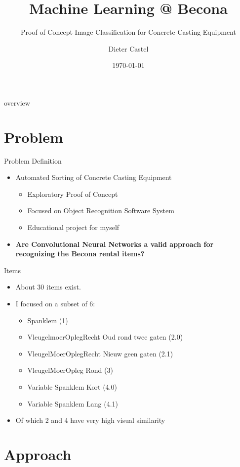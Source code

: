 \documentclass{beamer}
\title{Machine Learning @ Becona}
\subtitle{Proof of Concept Image Classification for Concrete Casting Equipment}
\author{Dieter Castel}
\date{\today}
\begin{document}
\begin{frame}
  \titlepage
\end{frame}

\begin{frame}{overview}
\tableofcontents
\end{frame}

\section{Problem}
\begin{frame}{Problem Definition}
  \begin{itemize}
	    \item Automated Sorting of Concrete Casting Equipment 
	    \begin{itemize}
	      \item Exploratory Proof of Concept 
	      \item Focused on Object Recognition Software System
	      \item Educational project for myself 
	    \end{itemize}
	    \item \textbf{Are Convolutional Neural Networks a valid approach for recognizing the Becona rental items?}
  \end{itemize}
\end{frame}

\begin{frame}{Items}
  \begin{itemize}
	    \item About 30 items exist.
	    \item I focused on a subset of 6: 
	    \begin{itemize}
	      \item Spanklem (1)
	      \item VleugelmoerOplegRecht Oud rond twee gaten (2.0)
	      \item VleugelMoerOplegRecht Nieuw geen gaten (2.1)
	      \item VleugelMoerOpleg Rond (3)
	      \item Variable Spanklem Kort (4.0)
	      \item Variable Spanklem Lang (4.1)
	    \end{itemize}
	    \item Of which 2 and 4 have very high visual similarity
  \end{itemize}
\end{frame}

\section{Approach}
\end{document}
